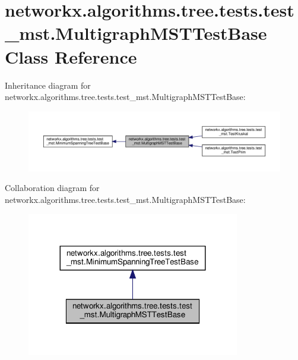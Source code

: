 \hypertarget{classnetworkx_1_1algorithms_1_1tree_1_1tests_1_1test__mst_1_1MultigraphMSTTestBase}{}\section{networkx.\+algorithms.\+tree.\+tests.\+test\+\_\+mst.\+Multigraph\+M\+S\+T\+Test\+Base Class Reference}
\label{classnetworkx_1_1algorithms_1_1tree_1_1tests_1_1test__mst_1_1MultigraphMSTTestBase}


Inheritance diagram for networkx.\+algorithms.\+tree.\+tests.\+test\+\_\+mst.\+Multigraph\+M\+S\+T\+Test\+Base\+:
\nopagebreak
\begin{figure}[H]
\begin{center}
\leavevmode
\includegraphics[width=350pt]{classnetworkx_1_1algorithms_1_1tree_1_1tests_1_1test__mst_1_1MultigraphMSTTestBase__inherit__graph}
\end{center}
\end{figure}


Collaboration diagram for networkx.\+algorithms.\+tree.\+tests.\+test\+\_\+mst.\+Multigraph\+M\+S\+T\+Test\+Base\+:
\nopagebreak
\begin{figure}[H]
\begin{center}
\leavevmode
\includegraphics[width=263pt]{classnetworkx_1_1algorithms_1_1tree_1_1tests_1_1test__mst_1_1MultigraphMSTTestBase__coll__graph}
\end{center}
\end{figure}
